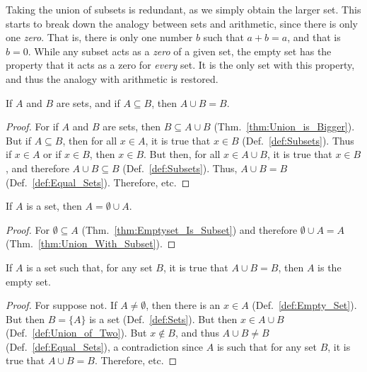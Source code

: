             Taking the union of subsets is redundant, as we
            simply obtain the larger set. This starts to break
            down the analogy between sets and arithmetic, since
            there is only one \textit{zero}. That is, there is
            only one number $b$ such that $a+b=a$, and that is
            $b=0$. While any subset acts as a \textit{zero} of a
            given set, the empty set has the property that it
            acts as a zero for \textit{every} set. It is the only
            set with this property, and thus the analogy with
            arithmetic is restored.
            \begin{theorem}
                \label{thm:Union_With_Subset}%
                If $A$ and $B$ are sets, and if
                $A\subseteq{B}$, then $A\cup{B}=B$.
            \end{theorem}
            \begin{proof}
                For if $A$ and $B$ are sets, then
                $B\subseteq{A}\cup{B}$
                (Thm.~\ref{thm:Union_is_Bigger}).
                But if $A\subseteq{B}$, then for all $x\in{A}$,
                it is true that $x\in{B}$
                (Def.~\ref{def:Subsets}). Thus if $x\in{A}$ or if
                $x\in{B}$, then $x\in{B}$. But then, for all
                $x\in{A}\cup{B}$, it is true that $x\in{B}$, and
                therefore $A\cup{B}\subseteq{B}$
                (Def.~\ref{def:Subsets}). Thus,
                $A\cup{B}=B$ (Def.~\ref{def:Equal_Sets}).
                Therefore, etc.
            \end{proof}
            \begin{theorem}
                \label{thm:Union_with_Emptyset}%
                If $A$ is a set, then $A=\emptyset\cup{A}$.
            \end{theorem}
            \begin{proof}
                For $\emptyset\subseteq{A}$
                (Thm.~\ref{thm:Emptyset_Is_Subset}) and
                therefore $\emptyset\cup{A}=A$
                (Thm.~\ref{thm:Union_With_Subset}).
            \end{proof}
            \begin{theorem}
                \label{thm:Empty_Set_Is_Zero_for_Unions}%
                If $A$ is a set such that, for any set $B$, it is
                true that $A\cup{B}=B$, then $A$ is the
                empty set.
            \end{theorem}
            \begin{proof}
                For suppose not. If $A\ne\emptyset$, then there
                is an $x\in{A}$ (Def.~\ref{def:Empty_Set}).
                But then $B=\{A\}$ is a set
                (Def.~\ref{def:Sets}). But then $x\in{A}\cup{B}$
                (Def.~\ref{def:Union_of_Two}). But $x\notin{B}$,
                and thus $A\cup{B}\ne{B}$
                (Def.~\ref{def:Equal_Sets}), a contradiction
                since $A$ is such that for any set $B$, it is
                true that $A\cup{B}=B$. Therefore, etc.
            \end{proof}
